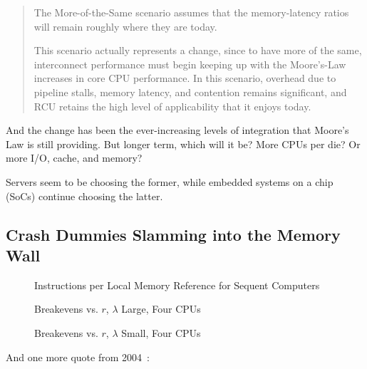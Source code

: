\begin{quote}
	The More-of-the-Same scenario assumes that the memory-latency
	ratios will remain roughly where they are today.

	This scenario actually represents a change, since to have more
	of the same, interconnect performance must begin keeping up
	with the Moore's-Law increases in core CPU performance.  In this
	scenario, overhead due to pipeline stalls, memory latency, and
	contention remains significant, and RCU retains the high level
	of applicability that it enjoys today.
\end{quote}

And the change has been the ever-increasing levels of integration
that Moore's Law is still providing.
But longer term, which will it be?
More CPUs per die?
Or more I/O, cache, and memory?

Servers seem to be choosing the former, while embedded systems on a chip
(SoCs) continue choosing the latter.

\subsection{Crash Dummies Slamming into the Memory Wall}
\label{sec:future:Crash Dummies Slamming into the Memory Wall}

\begin{figure}[tbp]
\centering
\epsfxsize=3in
\caption{Instructions per Local Memory Reference for Sequent Computers}
\label{fig:future:Instructions per Local Memory Reference for Sequent Computers}
\end{figure}

\begin{figure}[htbp]
\centering
\epsfxsize=3in
\caption{Breakevens vs. $r$, $\lambda$ Large, Four CPUs}
\label{fig:future:Breakevens vs. r, lambda Large, Four CPUs}
\end{figure}

\begin{figure}[htbp]
\centering
\epsfxsize=3in
\caption{Breakevens vs. $r$, $\lambda$ Small, Four CPUs}
\label{fig:future:Breakevens vs. r, Worst-Case lambda, Four CPUs}
\end{figure}

And one more quote from 2004~\cite{PaulEdwardMcKenneyPhD}:

